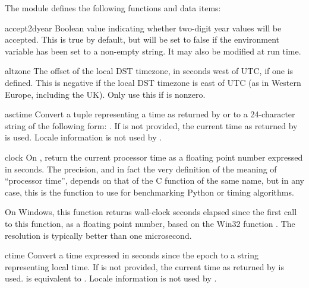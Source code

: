 The module defines the following functions and data items:


\begin{datadesc}{accept2dyear}
Boolean value indicating whether two-digit year values will be
accepted.  This is true by default, but will be set to false if the
environment variable  has been set to a non-empty
string.  It may also be modified at run time.
\end{datadesc}

\begin{datadesc}{altzone}
The offset of the local DST timezone, in seconds west of UTC, if one
is defined.  This is negative if the local DST timezone is east of UTC
(as in Western Europe, including the UK).  Only use this if
 is nonzero.
\end{datadesc}

\begin{funcdesc}{asctime}{}
Convert a tuple representing a time as returned by 
or  to a 24-character string of the following form:
.  If  is not provided, the
current time as returned by  is used.
Locale information is not used by .
\end{funcdesc}

\begin{funcdesc}{clock}{}
On \UNIX, return
the current processor time as a floating point number expressed in
seconds.  The precision, and in fact the very definition of the meaning
of ``processor time'', depends
on that of the C function of the same name, but in any case, this is
the function to use for benchmarking Python or
timing algorithms.

On Windows, this function returns wall-clock seconds elapsed since the
first call to this function, as a floating point number,
based on the Win32 function .
The resolution is typically better than one microsecond.
\end{funcdesc}

\begin{funcdesc}{ctime}{}
Convert a time expressed in seconds since the epoch to a string
representing local time. If  is not provided, the current time
as returned by  is used.  
is equivalent to .
Locale information is not used by .
\end{funcdesc}

